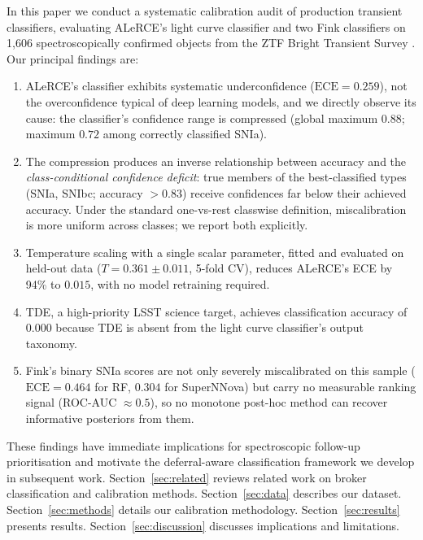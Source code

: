 \documentclass[twocolumn]{aastex631}
\begin{document}
In this paper we conduct a systematic calibration audit of
production transient classifiers, evaluating ALeRCE's light curve
classifier and two Fink classifiers on 1,606 spectroscopically
confirmed objects from the ZTF Bright Transient Survey
\citep{Fremling2020, Perley2020}. Our principal findings are:

\begin{enumerate}
\item ALeRCE's classifier exhibits systematic underconfidence
($\mathrm{ECE} = 0.259$), not the overconfidence typical of
deep learning models, and we directly observe its cause: the
classifier's confidence range is compressed (global maximum $0.88$;
maximum $0.72$ among correctly classified SNIa).

\item The compression produces an inverse relationship between
accuracy and the \emph{class-conditional confidence deficit}: true
members of the best-classified types (SNIa, SNIbc; accuracy
$>0.83$) receive confidences far below their achieved accuracy.
Under the standard one-vs-rest classwise definition, miscalibration
is more uniform across classes; we report both explicitly.

\item Temperature scaling with a single scalar parameter, fitted
and evaluated on held-out data ($T = 0.361 \pm 0.011$, 5-fold CV),
reduces ALeRCE's ECE by 94\% to $0.015$, with no model retraining
required.

\item TDE, a high-priority LSST science target, achieves
classification accuracy of $0.000$ because TDE is absent from the
light curve classifier's output taxonomy.

\item Fink's binary SNIa scores are not only severely miscalibrated
on this sample ($\mathrm{ECE} = 0.464$ for RF, $0.304$ for
SuperNNova) but carry no measurable ranking signal
(ROC-AUC $\approx 0.5$), so no monotone post-hoc method can recover
informative posteriors from them.
\end{enumerate}

These findings have immediate implications for spectroscopic 
follow-up prioritisation and motivate the deferral-aware 
classification framework we develop in subsequent work. 
Section~\ref{sec:related} reviews related work on broker 
classification and calibration methods. 
Section~\ref{sec:data} describes our dataset. 
Section~\ref{sec:methods} details our calibration methodology. 
Section~\ref{sec:results} presents results. 
Section~\ref{sec:discussion} discusses implications and limitations.
\end{document}
